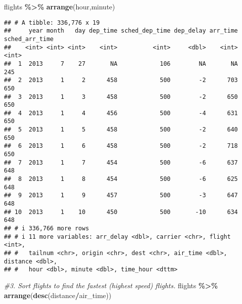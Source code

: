 \documentclass[
]{article}
\newenvironment{Shaded}{\begin{snugshade}}{\end{snugshade}}
\newcommand{\CommentTok}[1]{\textcolor[rgb]{0.56,0.35,0.01}{\textit{#1}}}
\newcommand{\FunctionTok}[1]{\textcolor[rgb]{0.13,0.29,0.53}{\textbf{#1}}}
\newcommand{\NormalTok}[1]{#1}
\newcommand{\SpecialCharTok}[1]{\textcolor[rgb]{0.81,0.36,0.00}{\textbf{#1}}}
\begin{document}
\begin{Shaded}
\begin{Highlighting}[]
\NormalTok{flights }\SpecialCharTok{\%\textgreater{}\%} 
    \FunctionTok{arrange}\NormalTok{(hour,minute)}
\end{Highlighting}
\end{Shaded}

\begin{verbatim}
## # A tibble: 336,776 x 19
##     year month   day dep_time sched_dep_time dep_delay arr_time sched_arr_time
##    <int> <int> <int>    <int>          <int>     <dbl>    <int>          <int>
##  1  2013     7    27       NA            106        NA       NA            245
##  2  2013     1     2      458            500        -2      703            650
##  3  2013     1     3      458            500        -2      650            650
##  4  2013     1     4      456            500        -4      631            650
##  5  2013     1     5      458            500        -2      640            650
##  6  2013     1     6      458            500        -2      718            650
##  7  2013     1     7      454            500        -6      637            648
##  8  2013     1     8      454            500        -6      625            648
##  9  2013     1     9      457            500        -3      647            648
## 10  2013     1    10      450            500       -10      634            648
## # i 336,766 more rows
## # i 11 more variables: arr_delay <dbl>, carrier <chr>, flight <int>,
## #   tailnum <chr>, origin <chr>, dest <chr>, air_time <dbl>, distance <dbl>,
## #   hour <dbl>, minute <dbl>, time_hour <dttm>
\end{verbatim}

\begin{Shaded}
\begin{Highlighting}[]
\CommentTok{\#3. Sort flights to find the fastest (highest speed) flights.}
\NormalTok{flights }\SpecialCharTok{\%\textgreater{}\%} 
    \FunctionTok{arrange}\NormalTok{(}\FunctionTok{desc}\NormalTok{(distance}\SpecialCharTok{/}\NormalTok{air\_time))}
\end{Highlighting}
\end{Shaded}
\end{document}
